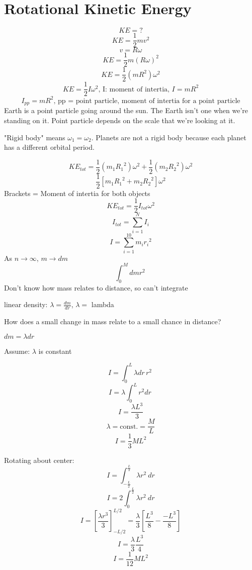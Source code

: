 \documentclass[fleqn]{article}
\begin{document}
\setlength{\mathindent}{0pt}
\section*{Rotational Kinetic Energy}
\[ KE = \text{?}  \]
\[ KE = \frac{1}{2} mv^2 \]
\[ v = R \omega \]
\[ KE = \frac{1}{2} m \left( R \omega \right)^2 \]
\[ KE = \frac{1}{2} \left( m R^2 \right) \omega ^2 \]
\[ KE = \frac{1}{2} I \omega ^2 \text{, I: moment of intertia, } I = mR^2 \]
\[ I _{pp} = m R^2 \text{, pp = point particle, moment of intertia for a point particle}   \]
Earth is a point particle going around the sun. The Earth isn't one when we're standing on it. Point particle depends on the scale that we're looking at it.

"Rigid body" means $\omega _{1} = \omega _{2}  $.
Planets are not a rigid body because each planet has a different orbital period.

\[ KE _{tot} =  \frac{1}{2} \left( m_1 {R_1}^2 \right) \omega ^2 + \frac{1}{2} \left( m_2{R_2}^2 \right) \omega ^2 \]
\[ \frac{1}{2} \left[ m_1{R_1} ^2 + m_2{R_2} ^2  \right] \omega ^2 \]
Brackets = Moment of intertia for both objects
\[ KE _{tot} = \frac{1}{2} I _{tot} \omega ^2  \]
\[ I _{tot} = \sum^N_{i=1} I _{i}   \]
\[ I = \sum^{10}_{i=1} m_i {r_i}^2 \]
As $n \to \infty$, $m \to dm$
\[ \int_{0}^{M} dmr^2\  \]
Don't know how mass relates to distance, so can't integrate

linear density: $\lambda = \frac{dm}{dr} $, $\lambda = $ lambda

How does a small change in mass relate to a small chance in distance?

$dm = \lambda dr$

Assume: $\lambda $ is constant

\[ I = \int_{0}^{L}{\lambda dr\, r^2}\  \]
\[ I = \lambda \int_{0}^{L} r^2 dr\ \]
\[ I = \frac{\lambda L^3}{3}  \]
\[ \lambda = \text{const.} = \frac{M}{L}   \]
\[ I = \frac{1}{3} ML^2 \]

Rotating about center:
\[ I = \int_{- \frac{L}{2} }^{\frac{L}{2} } \lambda r^2 \ dr \]
\[ I = 2 \int_{0}^{\frac{L}{2} } \lambda r^2\ dr \]
\[ I = \left[ \frac{\lambda r^3}{3} \right]^{L/2}_{-L/2} = \frac{\lambda}{3} \left[ \frac{L^3}{8} - \frac{-L^3}{8}  \right]  \]
\[ I = \frac{\lambda}{3} \frac{L^3}{4}  \]
\[ I = \frac{1}{12} ML^2 \]
\end{document}
